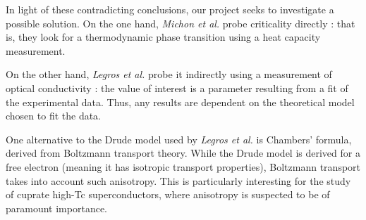 In light of these contradicting conclusions, our project seeks to investigate a possible solution.
On the one hand, \textit{Michon et al.} probe criticality directly : 
that is, they look for a thermodynamic phase transition using a heat capacity measurement.

On the other hand, \textit{Legros et al.} probe it indirectly using a measurement of optical conductivity : 
the value of interest is a parameter resulting from a fit of the experimental data. 
Thus, any results are dependent on the theoretical model chosen to fit the data.

One alternative to the Drude model used by \textit{Legros et al.} is Chambers' formula, 
derived from Boltzmann transport theory. 
While the Drude model is derived for a free electron 
(meaning it has isotropic transport properties), 
Boltzmann transport takes into account such anisotropy. 
This is particularly interesting for the study of cuprate high-Tc superconductors, 
where anisotropy is suspected to be of paramount importance.

